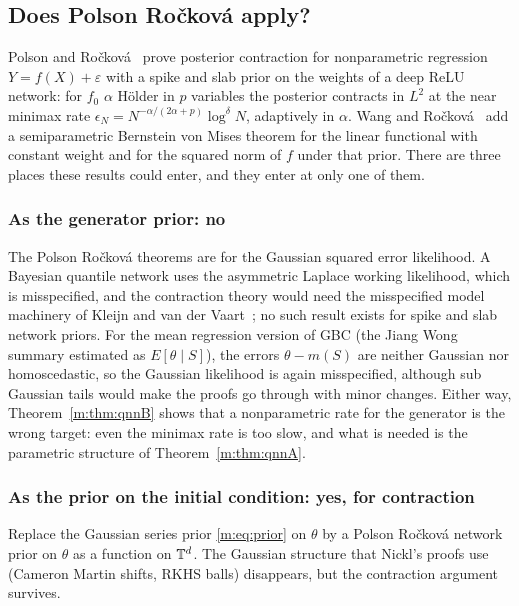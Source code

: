\subsection{Does Polson Ro\v{c}kov\'a apply?}

Polson and Ro\v{c}kov\'a~\cite{polsonrockova2018} prove posterior contraction for nonparametric regression $Y=f(X)+\varepsilon$ with a spike and slab prior on the weights of a deep ReLU network: for $f_0$ $\alpha$ H\"older in $p$ variables the posterior contracts in $L^2$ at the near minimax rate $\epsilon_N=N^{-\alpha/(2\alpha+p)}\log^\delta N$, adaptively in $\alpha$. Wang and Ro\v{c}kov\'a~\cite{wangrockova2020} add a semiparametric Bernstein von Mises theorem for the linear functional with constant weight and for the squared norm of $f$ under that prior. There are three places these results could enter, and they enter at only one of them.

\subsubsection{As the generator prior: no} The Polson Ro\v{c}kov\'a theorems are for the Gaussian squared error likelihood. A Bayesian quantile network uses the asymmetric Laplace working likelihood, which is misspecified, and the contraction theory would need the misspecified model machinery of Kleijn and van der Vaart~\cite{kleijnvandervaart2006}; no such result exists for spike and slab network priors. For the mean regression version of GBC (the Jiang Wong summary estimated as $E[\theta\mid S]$), the errors $\theta-m(S)$ are neither Gaussian nor homoscedastic, so the Gaussian likelihood is again misspecified, although sub Gaussian tails would make the proofs go through with minor changes. Either way, Theorem~\ref{m:thm:qnnB} shows that a nonparametric rate for the generator is the wrong target: even the minimax rate is too slow, and what is needed is the parametric structure of Theorem~\ref{m:thm:qnnA}.

\subsubsection{As the prior on the initial condition: yes, for contraction} Replace the Gaussian series prior \eqref{m:eq:prior} on $\theta$ by a Polson Ro\v{c}kov\'a network prior on $\theta$ as a function on $\mathbb{T}^d$. The Gaussian structure that Nickl's proofs use (Cameron Martin shifts, RKHS balls) disappears, but the contraction argument survives.

